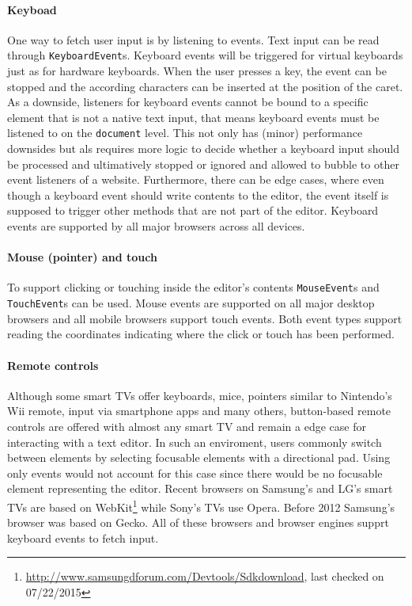 \paragraph{Keyboad} One way to fetch user input is by listening to events. Text input can be read through \texttt{KeyboardEvent}s. Keyboard events will be triggered for virtual keyboards just as for hardware keyboards. When the user presses a key, the event can be stopped and the according characters can be inserted at the position of the caret. As a downside, listeners for keyboard events cannot be bound to a specific element that is not a native text input, that means keyboard events must be listened to on the \texttt{document} level. This not only has (minor) performance downsides but als requires more logic to decide whether a keyboard input should be processed and ultimatively stopped or ignored and allowed to bubble to other event listeners of a website. Furthermore, there can be edge cases, where even though a keyboard event should write contents to the editor, the event itself is supposed to trigger other methods that are not part of the editor. Keyboard events are supported by all major browsers across all devices.

\paragraph{Mouse (pointer) and touch} To support clicking or touching inside the editor's contents \texttt{MouseEvent}s and \texttt{TouchEvent}s can be used. Mouse events are supported on all major desktop browsers and all mobile browsers support touch events. Both event types support reading the coordinates indicating where the click or touch has been performed.

\paragraph{Remote controls} Although some smart TVs offer keyboards, mice, pointers similar to Nintendo's Wii remote, input via smartphone apps and many others, button-based remote controls are offered with almost any smart TV and remain a edge case for interacting with a text editor. In such an enviroment, users commonly switch between elements by selecting focusable elements with a directional pad. Using only events would not account for this case since there would be no focusable element representing the editor. Recent browsers on Samsung's and LG's smart TVs are based on WebKit\footnote{\url{http://www.samsungdforum.com/Devtools/Sdkdownload}, last checked on 07/22/2015} while Sony's TVs use Opera. Before 2012 Samsung's browser was based on Gecko. All of these browsers and browser engines supprt keyboard events to fetch input.

